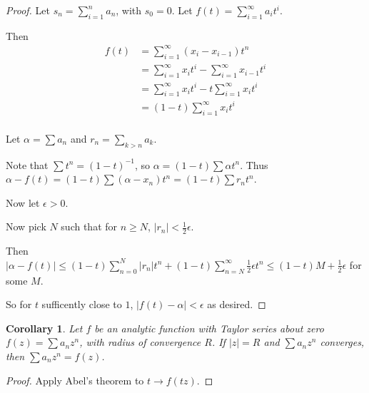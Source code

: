 \documentclass[a4paper]{book}
\newtheorem{corollary}{Corollary}[section]
\begin{document}
\begin{proof}
Let \(s_n = \sum\limits_{i = 1}^n a_n\), with \(s_0 = 0\).
Let \(f(t) = \sum\limits_{i = 1}^\infty a_i t^i\).

Then
\begin{align*}
f(t) &= \sum\limits_{i = 1}^\infty (x_i - x_{i - 1}) t^n\\
&= \sum\limits_{i = 1}^\infty x_i t^i -  \sum\limits_{i = 1}^\infty x_{i - 1} t^i\\
&= \sum\limits_{i = 1}^\infty x_i t^i -  t \sum\limits_{i = 1}^\infty x_i t^i\\
&= (1 - t) \sum\limits_{i = 1}^{\infty} x_i t^i\\
\end{align*}

Let \(\alpha = \sum a_n\) and \(r_n = \sum\limits_{k > n} a_k\).

Note that \(\sum t^n = {(1 - t)}^{-1}\),
so \(\alpha = (1 - t) \sum \alpha t^n\).
Thus \(\alpha - f(t) = (1 - t) \sum (\alpha - x_n) t^n = (1 - t) \sum r_n t^n \).

Now let \(\epsilon > 0\).

Now pick \(N\) such that for \(n \geq N\),
\(|r_n| < \frac{1}{2}\epsilon\).

Then \(|\alpha - f(t)| \leq (1 - t) \sum\limits_{n = 0}^N |r_n| t^n + (1 - t) \sum\limits_{n = N}^\infty \frac{1}{2}\epsilon t^n \leq (1 - t) M + \frac{1}{2} \epsilon\) for some \(M\).

So for \(t\) sufficently close to \(1\),
\(|f(t) - \alpha| < \epsilon\) as desired.
\end{proof}

\begin{corollary}
Let \(f\) be an analytic function with Taylor series about zero \(f(z) = \sum a_n z^n\),
with radius of convergence \(R\).
If \(|z| = R\) and \(\sum a_n z^n\) converges,
then \(\sum a_n z^n = f(z)\).
\end{corollary}

\begin{proof}
Apply Abel's theorem to \(t \to f(tz)\).
\end{proof}

{}

\end{document}
